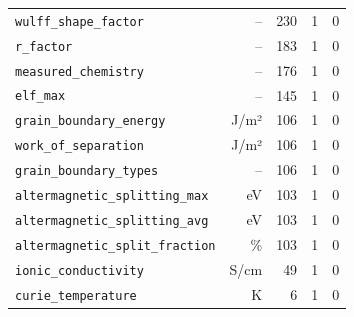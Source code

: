 \begin{longtable}{lrrrr}
\texttt{wulff\_shape\_factor} & -- & 230 & 1 & 0 \\
\texttt{r\_factor} & -- & 183 & 1 & 0 \\
\texttt{measured\_chemistry} & -- & 176 & 1 & 0 \\
\texttt{elf\_max} & -- & 145 & 1 & 0 \\
\texttt{grain\_boundary\_energy} & J/m² & 106 & 1 & 0 \\
\texttt{work\_of\_separation} & J/m² & 106 & 1 & 0 \\
\texttt{grain\_boundary\_types} & -- & 106 & 1 & 0 \\
\texttt{altermagnetic\_splitting\_max} & eV & 103 & 1 & 0 \\
\texttt{altermagnetic\_splitting\_avg} & eV & 103 & 1 & 0 \\
\texttt{altermagnetic\_split\_fraction} & \% & 103 & 1 & 0 \\
\texttt{ionic\_conductivity} & S/cm & 49 & 1 & 0 \\
\texttt{curie\_temperature} & K & 6 & 1 & 0 \\
\end{longtable}

